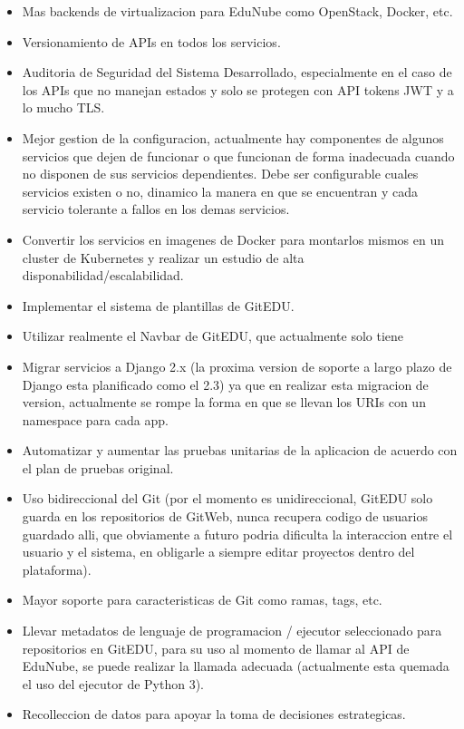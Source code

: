 \begin{itemize}
    \item Mas backends de virtualizacion para EduNube como OpenStack, Docker, etc.
    \item Versionamiento de APIs en todos los servicios.
    \item Auditoria de Seguridad del Sistema Desarrollado, especialmente en el caso de los APIs que no manejan estados y solo se protegen con API tokens JWT y a lo mucho TLS.
    \item Mejor gestion de la configuracion, actualmente hay componentes de algunos servicios que dejen de funcionar o que funcionan de forma inadecuada cuando no disponen de sus servicios dependientes. Debe ser configurable cuales servicios existen o no, dinamico la manera en que se encuentran y cada servicio tolerante a fallos en los demas servicios.
    \item Convertir los servicios en imagenes de Docker para montarlos mismos en un cluster de Kubernetes y realizar un estudio de alta disponabilidad/escalabilidad.
    \item Implementar el sistema de plantillas de GitEDU.
    \item Utilizar realmente el Navbar de GitEDU, que actualmente solo tiene 
    \item Migrar servicios a Django 2.x (la proxima version de soporte a largo plazo de Django esta planificado como el 2.3) ya que en realizar esta migracion de version, actualmente se rompe la forma en que se llevan los URIs con un namespace para cada app.
    \item Automatizar y aumentar las pruebas unitarias de la aplicacion de acuerdo con el plan de pruebas original.
    \item Uso bidireccional del Git (por el momento es unidireccional, GitEDU solo guarda en los repositorios de GitWeb, nunca recupera codigo de usuarios guardado alli, que obviamente a futuro podria dificulta la interaccion entre el usuario y el sistema, en obligarle a siempre editar proyectos dentro del plataforma).
    \item Mayor soporte para caracteristicas de Git como ramas, tags, etc.
    \item Llevar metadatos de lenguaje de programacion / ejecutor seleccionado para repositorios en GitEDU, para su uso al momento de llamar al API de EduNube, se puede realizar la llamada adecuada (actualmente esta quemada el uso del ejecutor de Python 3).
    \item Recolleccion de datos para apoyar la toma de decisiones estrategicas.
\end{itemize}
